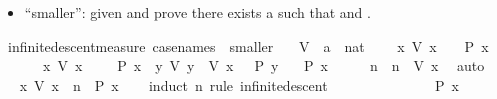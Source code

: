 \begin{isabellebody}
\begin{isamarkuptext}
\begin{itemize}
\item ``smaller'': given  and  prove
there exists a  such that  and .%
\end{itemize}%
\end{isamarkuptext}\isamarkuptrue%
\isamarkupfalse%
\ infinite{\isacharunderscore}{\kern0pt}descent{}{\isacharunderscore}{\kern0pt}measure\ {\isacharbrackleft}{\kern0pt}case{\isacharunderscore}{\kern0pt}names\ {}\ smaller{\isacharbrackright}{\kern0pt}{\isacharcolon}{\kern0pt}\isanewline
\ \ \ V\ {\isacharcolon}{\kern0pt}{\isacharcolon}{\kern0pt}\ {\isachardoublequoteopen}{\isacharprime}{\kern0pt}a\ {\isasymRightarrow}\ nat{\isachardoublequoteclose}\isanewline
\ \ \ {}{\isacharcolon}{\kern0pt}\ {\isachardoublequoteopen}{\isasymAnd}x{\isachardot}{\kern0pt}\ V\ x\ {\isacharequal}{\kern0pt}\ {}\ {\isasymLongrightarrow}\ P\ x{\isachardoublequoteclose}\isanewline
\ \ \ \ \ {}{\isacharcolon}{\kern0pt}\ {\isachardoublequoteopen}{\isasymAnd}x{\isachardot}{\kern0pt}\ V\ x\ {\isachargreater}{\kern0pt}\ {}\ {\isasymLongrightarrow}\ {\isasymnot}\ P\ x\ {\isasymLongrightarrow}\ {\isasymexists}y{\isachardot}{\kern0pt}\ V\ y\ {\isacharless}{\kern0pt}\ V\ x\ {\isasymand}\ {\isasymnot}\ P\ y{\isachardoublequoteclose}\isanewline
\ \ \ {\isachardoublequoteopen}P\ x{\isachardoublequoteclose}\isanewline
%
\isadelimproof
%
\endisadelimproof
%
\isatagproof
{}\isamarkupfalse%
\ {\isacharminus}{\kern0pt}\isanewline
\ \ \isamarkupfalse%
\ n\ \ {\isachardoublequoteopen}n\ {\isacharequal}{\kern0pt}\ V\ x{\isachardoublequoteclose}\ \isamarkupfalse%
\ auto\isanewline
\ \ \isamarkupfalse%
\ \isamarkupfalse%
\ {\isachardoublequoteopen}{\isasymAnd}x{\isachardot}{\kern0pt}\ V\ x\ {\isacharequal}{\kern0pt}\ n\ {\isasymLongrightarrow}\ P\ x{\isachardoublequoteclose}\isanewline
\ \ \isamarkupfalse%
\ {\isacharparenleft}{\kern0pt}induct\ n\ rule{\isacharcolon}{\kern0pt}\ infinite{\isacharunderscore}{\kern0pt}descent{}{\isacharparenright}{\kern0pt}\isanewline
\ \ \ \ \isamarkupfalse%
\ {}\isanewline
\ \ \ \ \isamarkupfalse%
\ {}\ \isamarkupfalse%
\ {\isachardoublequoteopen}P\ x{\isachardoublequoteclose}\ \isamarkupfalse%

\end{isabellebody}
